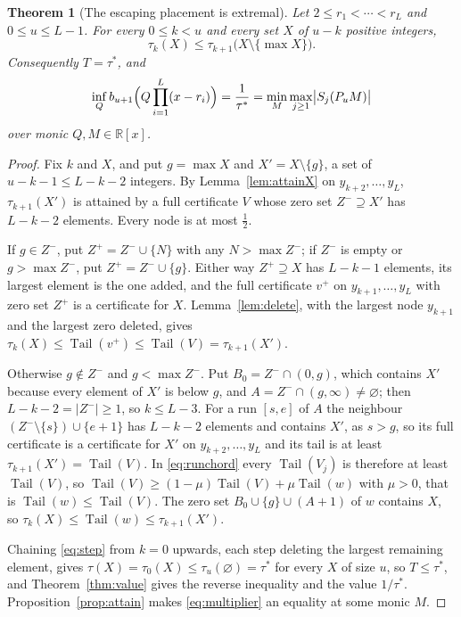 \documentclass[11pt]{article}
\newtheorem{theorem}{Theorem}[section]
\theoremstyle{definition}
\theoremstyle{plain}
\newcommand{\R}{\mathbb R}
\DeclareMathOperator{\Tail}{Tail}
\begin{document}
\begin{theorem}[The escaping placement is extremal]\label{thm:extremal}
Let $2\le r_1<\cdots<r_L$ and $0\le u\le L-1$.  For every $0\le k<u$ and every
set $X$ of $u-k$ positive integers,
\begin{equation}\label{eq:step}
  \tau_k(X)\le\tau_{k+1}\bigl(X\setminus\{\max X\}\bigr).
\end{equation}
Consequently $T=\tau^*$, and
\[
  \inf_Qb_{u+1}\Bigl(Q\prod_{i=1}^L(x-r_i)\Bigr)=\frac1{\tau^*}
  =\min_M\max_{j\ge1}\bigl|S_j(P_uM)\bigr|
\]
over monic $Q,M\in\R[x]$.
\end{theorem}

\begin{proof}
Fix $k$ and $X$, and put $g=\max X$ and $X'=X\setminus\{g\}$, a set of
$u-k-1\le L-k-2$ integers.  By Lemma~\ref{lem:attainX} on
$y_{k+2},\ldots,y_L$, $\tau_{k+1}(X')$ is attained by a full certificate $V$
whose zero set $Z^-\supseteq X'$ has $L-k-2$ elements.  Every node is at most
$\tfrac12$.

If $g\in Z^-$, put $Z^+=Z^-\cup\{N\}$ with any $N>\max Z^-$; if $Z^-$ is
empty or $g>\max Z^-$, put $Z^+=Z^-\cup\{g\}$.  Either way
$Z^+\supseteq X$ has $L-k-1$ elements, its largest element is the one added,
and the full certificate $v^+$ on $y_{k+1},\ldots,y_L$ with zero set $Z^+$ is a
certificate for $X$.  Lemma~\ref{lem:delete}, with the largest node $y_{k+1}$
and the largest zero deleted, gives
$\tau_k(X)\le\Tail(v^+)\le\Tail(V)=\tau_{k+1}(X')$.

Otherwise $g\notin Z^-$ and $g<\max Z^-$.  Put $B_0=Z^-\cap(0,g)$, which
contains $X'$ because every element of $X'$ is below $g$, and
$A=Z^-\cap(g,\infty)\ne\varnothing$; then $L-k-2=|Z^-|\ge1$, so $k\le L-3$.
For a run $[s,e]$ of $A$ the neighbour $(Z^-\setminus\{s\})\cup\{e+1\}$ has
$L-k-2$ elements and contains $X'$, as $s>g$, so its full certificate is a
certificate for $X'$ on $y_{k+2},\ldots,y_L$ and its tail is at least
$\tau_{k+1}(X')=\Tail(V)$.  In \eqref{eq:runchord} every $\Tail(V_j)$ is
therefore at least $\Tail(V)$, so
$\Tail(V)\ge(1-\mu)\Tail(V)+\mu\Tail(w)$ with $\mu>0$, that is
$\Tail(w)\le\Tail(V)$.  The zero set $B_0\cup\{g\}\cup(A+1)$ of $w$ contains
$X$, so $\tau_k(X)\le\Tail(w)\le\tau_{k+1}(X')$.

Chaining \eqref{eq:step} from $k=0$ upwards, each step deleting the largest
remaining element, gives $\tau(X)=\tau_0(X)\le\tau_u(\varnothing)=\tau^*$ for
every $X$ of size $u$, so $T\le\tau^*$, and Theorem~\ref{thm:value} gives the
reverse inequality and the value $1/\tau^*$.  Proposition~\ref{prop:attain}
makes \eqref{eq:multiplier} an equality at some monic $M$.
\end{proof}
\end{document}
